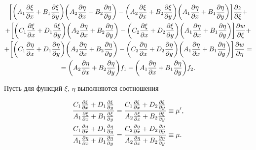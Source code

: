 \begin{multline} 


\bigg[\bigg(A_1\myfrac{\xi}{x}+B_1\myfrac{\xi}{y} \bigg) 


\bigg(A_2\myfrac{\eta}{x}+B_2\myfrac{\eta}{y} \bigg)-


\bigg(A_2\myfrac{\xi}{x}+B_2\myfrac{\xi}{y} \bigg) 


\bigg(A_1\myfrac{\eta}{x}+B_1\myfrac{\eta}{y} \bigg)\bigg] 


\myfrac{z}{\xi}+ \\ 


% 


+\bigg[\bigg(C_1\myfrac{\xi}{x}+D_1\myfrac{\xi}{y} \bigg) 


\bigg(A_2\myfrac{\eta}{x}+B_2\myfrac{\eta}{y} \bigg) -


\bigg(C_2\myfrac{\xi}{x}+D_2\myfrac{\xi}{y} \bigg) 


\bigg(A_1\myfrac{\eta}{x}+B_1\myfrac{\eta}{y} \bigg)\bigg] 


\myfrac{w}{\xi}+ \\ 


% 


+\bigg[\bigg(C_1\myfrac{\eta}{x}+D_1\myfrac{\eta}{y} \bigg) 


\bigg(A_2\myfrac{\eta}{x}+B_2\myfrac{\eta}{y} \bigg) - 


\bigg(C_2\myfrac{\eta}{x}+D_2\myfrac{\eta}{y} \bigg) 


\bigg(A_1\myfrac{\eta}{x}+B_1\myfrac{\eta}{y} \bigg)\bigg] 


\myfrac{w}{\eta} = \\ 


% 


=\bigg(A_2\myfrac{\eta}{x}+B_2\myfrac{\eta}{y} \bigg)f_1- 


\bigg(A_1\myfrac{\eta}{x}+B_1\myfrac{\eta}{y} \bigg)f_2. 


\end{multline} 


Пусть для функций $\xi$, $\eta$ выполняются соотношения 


\begin{align} 


\frac{C_1\myfrac{\xi}{x}+D_1\myfrac{\xi}{y}} 


{A_1\myfrac{\xi}{x}+B_1\myfrac{\xi}{y}}&= 


\frac{C_1\myfrac{\xi}{x}+D_2\myfrac{\xi}{y}} 


{A_2\myfrac{\xi}{x}+B_2\myfrac{\xi}{y}}\equiv\mu', \\ 


% 


\frac{C_1\myfrac{\eta}{x}+D_1\myfrac{\eta}{y}} 


{A_1\myfrac{\eta}{x}+B_1\myfrac{\eta}{y}}&= 


\frac{C_2\myfrac{\eta}{x}+D_2\myfrac{\eta}{y}} 


{A_2\myfrac{\eta}{x}+B_2\myfrac{\eta}{y}}\equiv\mu. 


\end{align} 


